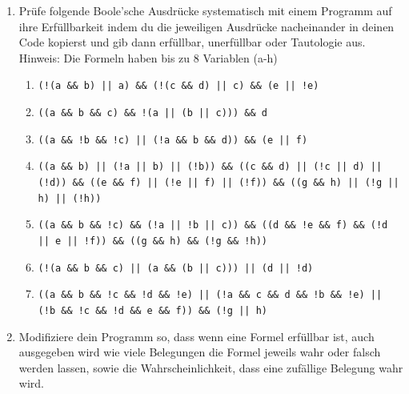 \documentclass{../../sheet}
\begin{document}
\begin{enumerate}
    \item Prüfe folgende Boole'sche Ausdrücke systematisch mit einem Programm auf ihre Erfüllbarkeit indem du die jeweiligen Ausdrücke nacheinander in deinen Code kopierst und gib dann erfüllbar, unerfüllbar oder Tautologie aus.\\
    Hinweis: Die Formeln haben bis zu 8 Variablen (a-h)
          \begin{enumerate}
              \item \begin{ausgabe} \texttt{(!(a \&\& b) || a) \&\& (!(c \&\& d) || c) \&\& (e || !e)} \end{ausgabe} %
              \item \begin{ausgabe} \texttt{((a \&\& b \&\& c) \&\& !(a || (b || c))) \&\& d} \end{ausgabe} %
              \item \begin{ausgabe} \texttt{((a \&\& !b \&\& !c) || (!a \&\& b \&\& d)) \&\& (e || f)} \end{ausgabe} %
              \item \begin{ausgabe} \texttt{((a \&\& b) || (!a || b) || (!b)) \&\&
                            ((c \&\& d) || (!c || d) || (!d)) \&\&
                            ((e \&\& f) || (!e || f) || (!f)) \&\&
                            ((g \&\& h) || (!g || h) || (!h))}
                    \end{ausgabe} %
              \item \begin{ausgabe} \texttt{((a \&\& b \&\& !c) \&\& (!a || !b || c)) \&\&
                            ((d \&\& !e \&\& f) \&\& (!d || e || !f)) \&\&
                            ((g \&\& h) \&\& (!g \&\& !h))}
                    \end{ausgabe} %
              \item \begin{ausgabe} \texttt{(!(a \&\& b \&\& c) || (a \&\& (b || c))) || (d || !d)} \end{ausgabe} %
              \item \begin{ausgabe} \texttt{((a \&\& b \&\& !c \&\& !d \&\& !e) ||
                            (!a \&\& c \&\& d \&\& !b \&\& !e) ||
                            (!b \&\& !c \&\& !d \&\& e \&\& f)) \&\& (!g || h)}
                    \end{ausgabe} %
        \end{enumerate}
        \item Modifiziere dein Programm so, dass wenn eine Formel erfüllbar ist, auch ausgegeben wird wie viele Belegungen die Formel jeweils wahr oder falsch werden lassen, sowie die Wahrscheinlichkeit, dass eine zufällige Belegung wahr wird. 
    \end{enumerate}
\end{document}
